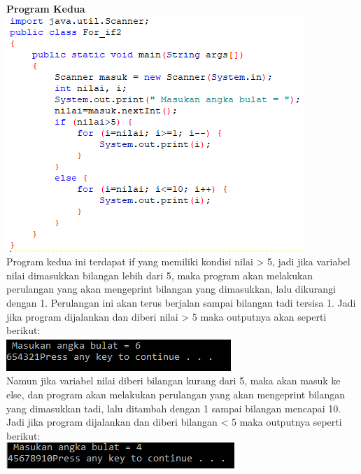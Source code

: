 \documentclass[a4paper,12pt]{article}
\begin{document}
\textbf{Program Kedua}\\
\includegraphics{img4.PNG}\\
Program kedua ini terdapat if yang memiliki kondisi nilai > 5, jadi jika variabel nilai dimasukkan bilangan lebih dari 5, maka program akan melakukan perulangan yang akan mengeprint bilangan yang dimasukkan, lalu dikurangi dengan 1. Perulangan ini akan terus berjalan sampai bilangan tadi tersisa 1. Jadi jika program dijalankan dan diberi nilai > 5 maka outputnya akan seperti berikut:\\
\includegraphics{img5.PNG}\\

Namun jika variabel nilai diberi bilangan kurang dari 5, maka akan masuk ke else, dan program akan melakukan perulangan yang akan mengeprint bilangan yang dimasukkan tadi, lalu ditambah dengan 1 sampai bilangan mencapai 10. Jadi jika program dijalankan dan diberi bilangan < 5 maka outputnya seperti berikut:\\
\includegraphics{img6.PNG}
\end{document}

